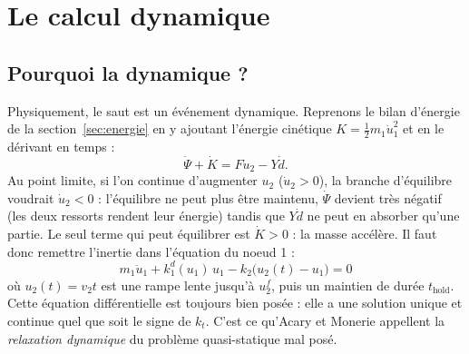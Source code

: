 \documentclass[11pt,a4paper]{article}
\newcommand{\kd}{k_1^{d}}
\begin{document}
\section{Le calcul dynamique}
\label{sec:dyn}

\subsection{Pourquoi la dynamique ?}
Physiquement, le saut est un événement dynamique. Reprenons le bilan d'énergie de la
section~\ref{sec:energie} en y ajoutant l'énergie cinétique $K = \tfrac12m_1\dot u_1^2$ et en
le dérivant en temps :
\begin{equation}
  \dot\Psi + \dot K = F\dot u_2 - Y\dot d .
\end{equation}
Au point limite, si l'on continue d'augmenter $u_2$ ($\dot u_2 > 0$), la branche d'équilibre
voudrait $\dot u_2 < 0$ : l'équilibre ne peut plus être maintenu, $\dot\Psi$ devient très
négatif (les deux ressorts rendent leur énergie) tandis que $Y\dot d$ ne peut en absorber qu'une
partie. Le seul terme qui peut équilibrer est $\dot K > 0$ : la masse accélère. Il faut donc
remettre l'inertie dans l'équation du noeud 1 :
\begin{equation}
  \boxed{\;m_1\ddot u_1 + \kd(u_1)\,u_1 - k_2\bigl(u_2(t)-u_1\bigr) = 0\;}
  \label{eq:mvt}
\end{equation}
où $u_2(t) = v_2t$ est une rampe lente jusqu'à $u_2^f$, puis un maintien de durée $t_{\text{hold}}$.
Cette équation différentielle est toujours bien posée : elle a une solution unique et continue
quel que soit le signe de $k_t$. C'est ce qu'Acary et Monerie appellent la \emph{relaxation
dynamique} du problème quasi-statique mal posé.
\end{document}
